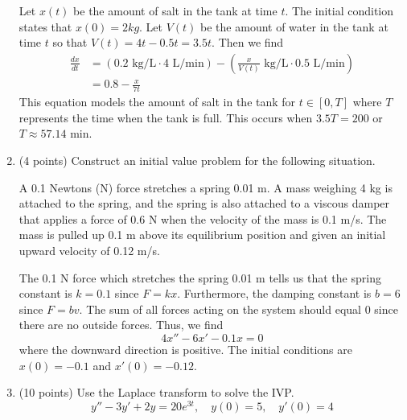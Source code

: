 \documentclass[11pt, titlepage]{article}
\begin{document}
\begin{enumerate}
        \begin{solution}
            Let $x(t)$ be the amount of salt in the tank at time $t$.
            The initial condition states that $x(0) = 2 kg$.
            Let $V(t)$ be the amount of water in the tank at time $t$ so that $V(t) = 4t - 0.5t = 3.5t$.
            Then we find
            \begin{align*}
                \frac{dx}{dt} &= (0.2 \text{ kg/L} \cdot 4 \text{ L/min}) - \left(\frac{x}{V(t)} \text{ kg/L} \cdot 0.5 \text{ L/min}\right) \\
                &= 0.8 - \frac{x}{7t}
            \end{align*}
            This equation models the amount of salt in the tank for $t \in [0, T]$ where $T$ represents the time when the tank is full.
            This occurs when $3.5T = 200$ or $T \approx 57.14 \text{ min}$.
        \end{solution}

        \pagebreak

        \item (4 points) Construct an initial value problem for the following situation.

        A 0.1 Newtons (N) force stretches a spring 0.01 m.
        A mass weighing 4 kg is attached to the spring, and the spring is also attached to a viscous damper that applies a force of 0.6 N when the velocity of the mass is 0.1 m/s. The mass is pulled up 0.1 m above its equilibrium position and given an initial upward velocity of 0.12 m/s.

        \begin{solution}
            The 0.1 N force which stretches the spring 0.01 m tells us that the spring constant is $k = 0.1$ since $F = kx$.
            Furthermore, the damping constant is $b = 6$ since $F = bv$.
            The sum of all forces acting on the system should equal 0 since there are no outside forces.
            Thus, we find
            \[
            4x'' - 6x' - 0.1x = 0
            \]
            where the downward direction is positive. The initial conditions are $x(0) = -0.1$ and $x'(0) = -0.12$.
        \end{solution}

        \pagebreak

        \item (10 points) Use the Laplace transform to solve the IVP.
        \[
        y'' - 3y' + 2y = 20e^{3t}, \quad y(0) = 5, \quad y'(0) = 4
        \]


\end{enumerate}
\end{document}
